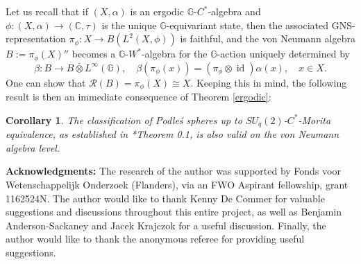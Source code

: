 \documentclass[reqno]{amsart}
\numberwithin{equation}{section}
\newtheorem{Cor}[Theorem]{Corollary}
\DeclareMathOperator{\id}{\mathrm{id}}
\newcommand{\C}{\mathbb{C}}
\newcommand{\G}{\mathbb{G}}
\newcommand{\ovot}{\bar{\otimes}}
\begin{document}
Let us recall that if $(X, \alpha)$ is an ergodic $\G$-$C^*$-algebra and $\phi: (X,\alpha) \to (\C, \tau)$ is the unique $\G$-equivariant state, then the associated GNS-representation
$\pi_\phi: X  \to B(L^2(X, \phi))$
is faithful, and the von Neumann algebra $B:= \pi_\phi(X)''$ becomes a $\G$-$W^*$-algebra for the $\G$-action uniquely determined by
$$\beta: B \to B \ovot L^\infty(\G), \quad \beta(\pi_\phi(x))= (\pi_\phi\otimes \id)\alpha(x), \quad x \in X.$$
One can show that $\mathcal{R}(B) = \pi_\phi(X)\cong X$. Keeping this in mind, the following result is then an immediate consequence of Theorem \ref{ergodic}:

\begin{Cor}\label{classification} The classification of Podleś spheres up to $SU_q(2)$-$C^*$-Morita equivalence, as established in \cite{DC12}*{Theorem 0.1}, is also valid on the von Neumann algebra level. 
\end{Cor}

\textbf{Acknowledgments:} The research of the author was supported by Fonds voor Wetenschappelijk Onderzoek (Flanders), via an FWO Aspirant fellowship, grant 1162524N. The author would like to thank Kenny De Commer for valuable suggestions and discussions
throughout this entire project, as well as Benjamin Anderson-Sackaney and Jacek Krajczok for a useful discussion. Finally, the author would like to thank the anonymous referee for providing useful suggestions.
\end{document}
